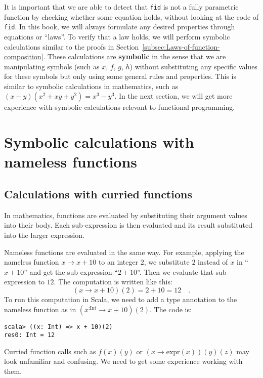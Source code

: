 It is important that we are able to detect that \lstinline!fid! is
not a fully parametric function by checking whether some equation
holds, without looking at the code of \lstinline!fid!. In this book,
we will always formulate any desired properties through equations
or \textsf{``}laws\textsf{''}. To verify that a law holds, we will perform symbolic
calculations similar to the proofs in
Section~\ref{subsec:Laws-of-function-composition}. These calculations
are \textbf{symbolic} in the sense that we are manipulating symbols
(such as $x$, $f$, $g$, $h$) without substituting any specific
values for these symbols but only using some general rules and properties.
This is similar to symbolic calculations in mathematics, such as $\left(x-y\right)\left(x^{2}+xy+y^{2}\right)=x^{3}-y^{3}$.
In the next section, we will get more experience with symbolic calculations
relevant to functional programming.

\section{Symbolic calculations with nameless functions}

\subsection{Calculations with curried functions}

In mathematics, functions are evaluated by substituting their argument
values into their body. Each sub-expression is then evaluated and
its result substituted into the larger expression.

Nameless functions are evaluated in the same way. For example, applying
the nameless function $x\rightarrow x+10$ to an integer $2$, we
substitute $2$ instead of $x$ in \textquotedblleft $x+10$\textquotedblright{}
and get the sub-expression \textquotedblleft $2+10$\textquotedblright .
Then we evaluate that sub-expression to $12$. The computation is
written like this:
\[
(x\rightarrow x+10)(2)=2+10=12\quad.
\]
To run this computation in Scala, we need to add a type annotation
to the nameless function as in $(x^{:\text{Int}}\rightarrow x+10)(2)$.
The code is:
\begin{lstlisting}
scala> ((x: Int) => x + 10)(2)
res0: Int = 12 
\end{lstlisting}

Curried function calls such as $f(x)(y)$ or $\left(x\rightarrow\text{expr}(x)\right)(y)(z)$
may look unfamiliar and confusing. We need to get some experience
working with them.

